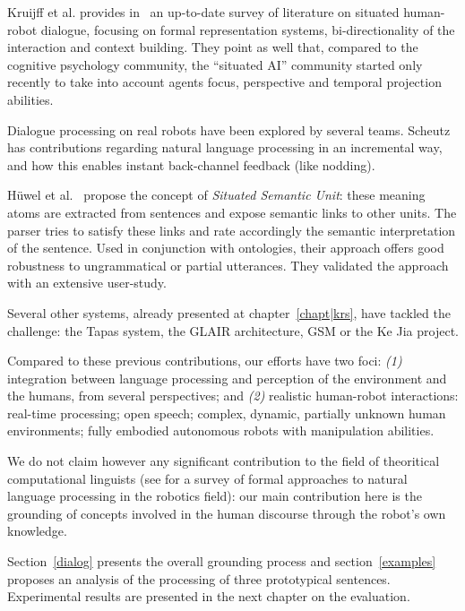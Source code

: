 Kruijff et al. provides in~\cite{Kruijff2010} an up-to-date survey of literature
on situated human-robot dialogue, focusing on formal representation systems,
bi-directionality of the interaction and context building. They point as well
that, compared to the cognitive psychology community, the ``situated AI''
community started only recently to take into account agents focus, perspective and temporal
projection abilities.

Dialogue processing on real robots have been explored by several teams.
Scheutz~\cite{Brick2007} has contributions regarding natural language
processing in an incremental way, and how this enables instant back-channel
feedback (like nodding).

Hüwel et al.~\cite{Huwel2006} propose the concept of \textit{Situated Semantic
Unit}: these meaning atoms are extracted from sentences and expose semantic
links to other units. The parser tries to satisfy these links and rate
accordingly the semantic interpretation of the sentence. Used in conjunction
with ontologies, their approach offers good robustness to ungrammatical or
partial utterances. They validated the approach with an extensive user-study.


Several other systems, already presented at chapter~\ref{chapt|krs}, have
tackled the challenge: the Tapas system, the GLAIR architecture, GSM or the Ke
Jia project.

Compared to these previous contributions, our efforts have two foci: {\it (1)}
integration between language processing and perception of the environment and
the humans, from several perspectives; and {\it (2)} realistic human-robot
interactions: real-time processing; open speech; complex, dynamic, partially
unknown human environments; fully embodied autonomous robots with manipulation
abilities. 

We do not claim however any significant contribution to the field of
theoritical computational linguists (see \cite{Kruijff2010} for a survey of
formal approaches to natural language processing in the robotics field): our
main contribution here is the grounding of concepts involved in the human
discourse through the robot's own knowledge.

Section~\ref{dialog} presents the overall grounding process and
section~\ref{examples} proposes an analysis of the processing of three
prototypical sentences.  Experimental results are presented in the next chapter
on the evaluation.

